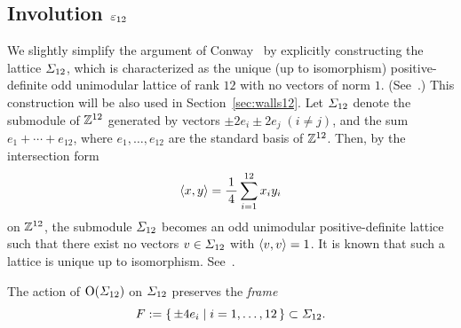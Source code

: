 \documentclass{amsart} %
\begin{document}
\subsection{Involution $\varepsilon_{12}$}\label{subsec:vep12}
%
We slightly simplify the argument of Conway~\cite[Chapter~10, Section~3.3]{theCSbook} 
by  explicitly constructing the  lattice  $\varSigma_{12}$,
which is characterized as the unique (up to isomorphism) positive-definite odd unimodular lattice  of rank $12$ 
with no vectors of norm $1$. (See~\cite[Chapter 16]{theCSbook}.)
This construction will be also used in Section~\ref{sec:walls12}.
Let $\varSigma_{12}$ denote the submodule of $\mathord{\mathbb{Z}}^{12}$ generated by vectors 
$\pm 2 e_i\pm 2 e_j\; (i\ne j)$, 
and the sum $e_1+\cdots+e_{12}$,
where $e_1,\dots, e_{12}$ are the standard basis of $\mathord{\mathbb{Z}}^{12}$.
Then, by the intersection form 
\[
\langle x, y \rangle=\frac{1}{\,4\,} \sum_{i=1}^{12} x_i y_i
\]
on $\mathord{\mathbb{Z}}^{12}$, the submodule $\varSigma_{12}$ becomes an odd unimodular
positive-definite  lattice 
such that there exist no vectors $v\in \varSigma_{12}$ with  $\langle v, v \rangle=1$.
It is known that such a lattice is unique up to isomorphism. 
See~\cite[Table 16.7]{theCSbook}.
%
\begin{lemma}\label{lem:frame}
The action of $\mathord{\mathrm{O}}(\varSigma_{12})$ on $\varSigma_{12}$  preserves
the \emph{frame}
\[
F:=\{\,{\pm 4 e_i}\mid {i=1, \dots, 12} \,\}\subset \varSigma_{12}.
\]
\end{lemma}
%
\end{document}

